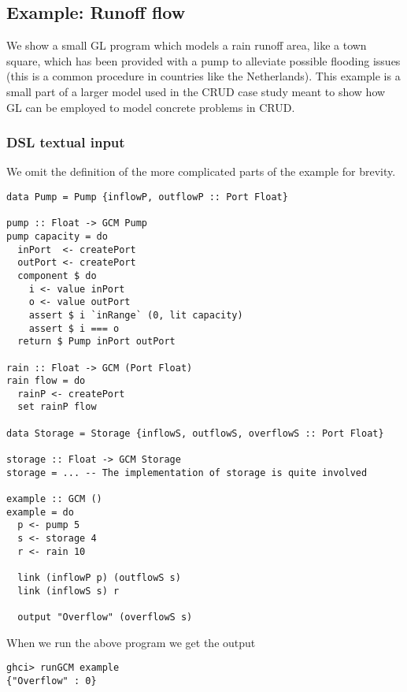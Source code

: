 \subsection{Example: Runoff flow}\label{example-runoff-flow}
We show a small GL program which models a rain runoff area,
like a town square, which has been provided with a pump to
alleviate possible flooding issues (this is a common procedure
in countries like the Netherlands). This example is a small part of
a larger model used in the CRUD case study meant to show how GL can be
employed to model concrete problems in CRUD.

\subsubsection{DSL textual input}\label{example-runoff-flow-dsl-textual-input}

We omit the definition of the
more complicated parts of the example for brevity.
\begin{verbatim}
data Pump = Pump {inflowP, outflowP :: Port Float}

pump :: Float -> GCM Pump
pump capacity = do
  inPort  <- createPort
  outPort <- createPort
  component $ do
    i <- value inPort
    o <- value outPort
    assert $ i `inRange` (0, lit capacity)
    assert $ i === o
  return $ Pump inPort outPort

rain :: Float -> GCM (Port Float)
rain flow = do
  rainP <- createPort
  set rainP flow

data Storage = Storage {inflowS, outflowS, overflowS :: Port Float}

storage :: Float -> GCM Storage
storage = ... -- The implementation of storage is quite involved

example :: GCM ()
example = do
  p <- pump 5
  s <- storage 4
  r <- rain 10

  link (inflowP p) (outflowS s)
  link (inflowS s) r

  output "Overflow" (overflowS s)
\end{verbatim}

When we run the above program we get the output

\begin{verbatim}
ghci> runGCM example
{"Overflow" : 0}
\end{verbatim}

